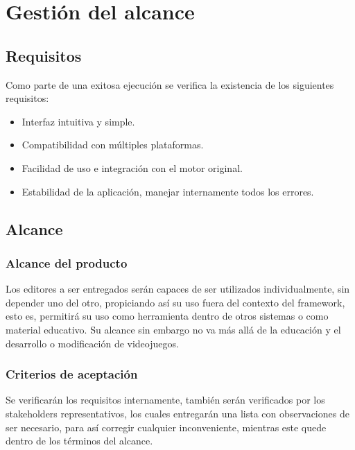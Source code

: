 \documentclass[]{article}
\begin{document}
\section{Gesti\'on del alcance}
\subsection{Requisitos}
Como parte de una exitosa ejecuci\'on se verifica la existencia de los siguientes requisitos: 
\begin{itemize}
 \item Interfaz intuitiva y simple. 
 \item Compatibilidad con m\'ultiples plataformas. 
 \item Facilidad de uso e integraci\'on con el motor original. 
 \item Estabilidad de la aplicaci\'on, manejar internamente todos los errores. 
 
\end{itemize}
\subsection{Alcance}
\subsubsection{Alcance del producto}
Los editores a ser entregados ser\'an capaces de ser utilizados individualmente, sin depender uno del otro, propiciando as\'i su uso fuera del contexto del framework, esto es, permitir\'a su uso como herramienta dentro de otros sistemas o como material educativo. Su alcance sin embargo no va m\'as all\'a de la educaci\'on y el desarrollo o modificaci\'on de videojuegos.
\subsubsection{Criterios de aceptaci\'on}
Se verificar\'an los requisitos internamente, tambi\'en ser\'an verificados por los stakeholders representativos, los cuales entregar\'an una lista con observaciones de ser necesario, para as\'i corregir cualquier inconveniente, mientras este quede dentro de los t\'erminos del alcance. 
\end{document}
